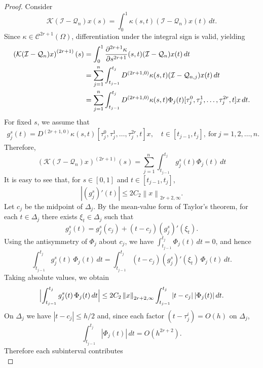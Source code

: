 \documentclass[]{interact}
\theoremstyle{plain}%
\theoremstyle{definition}
\theoremstyle{remark}
\newcommand{\norm}[1]{\left\lVert #1\right\rVert}
\begin{document}
\begin{proof}
	\noindent
	Consider 
	\begin{equation*} 
		\mathcal{K}(\mathcal{I} - \mathcal{Q}_n)x(s) =\int_0^1  \kappa(s,t) (\mathcal{I} - \mathcal{Q}_{n}) x(t) \, dt.
	\end{equation*}
	Since $\kappa \in \mathcal{C}^{2r+1}(\Omega)$, differentiation under the integral sign is valid, yielding
	\begin{align*} 
		\left(\mathcal{K}(\mathcal{I} - \mathcal{Q}_n)x\right)^{(2r+1)}(s) &=\int_0^1  \frac{\partial^{2r+1}\kappa}{\partial s^{2r+1}}(s,t) (\mathcal{I} - \mathcal{Q}_{n}) x(t) \, dt \notag \\ 
		&= \sum_{j=1}^{n} \int_{t_{j-1}}^{t_j}  D^{(2r+1,0)}\kappa(s,t) (\mathcal{I} - \mathcal{Q}_{n,j})x(t) \, dt \notag \\
		&=\sum_{j=1}^{n}\int_{t_{j-1}}^{t_j}
		D^{(2r+1,0)}\kappa(s,t)\Phi_j(t)
		[\tau_j^0,\tau_j^1,\ldots,\tau_j^{2r},t]x\,dt.  
	\end{align*}
	For fixed \(s\), we assume that
	\begin{align*}
		g_j^s(t) = D^{(2r+1,0)}\kappa(s,t) \left[\tau_j^0,\tau_j^1,\ldots, \tau_j^{2r},t\right]x, \quad t \in [t_{j-1}, t_j], ~ \text{for} ~ j=1,2,\ldots,n.
	\end{align*}
	Therefore,
	\begin{equation*} 
		\left(\mathcal{K}(\mathcal{I} - \mathcal{Q}_n)x\right)^{(2r+1)}(s)= \sum_{j=1}^{n ~}\int_{t_{j-1}}^{t_j} g_j^s(t) \Phi_j(t) \, dt
	\end{equation*}	
	It is easy to see that, for $s \in [0,1]$ and $t \in [t_{j-1},t_j]$,
	\begin{equation*}
		\left|(g_j^s)'(t) \right| \le 2 C_2 \norm{x}_{2r +2, \infty}.
	\end{equation*}
	Let $c_j$ be the midpoint of $\Delta_j$. By the mean-value form of Taylor's theorem, for each $t\in\Delta_j$ there exists $\xi_t\in\Delta_j$ such that
	\[
	g_j^s(t) = g_j^s(c_j) + (t-c_j)(g_j^s)'(\xi_t).
	\]
	Using the antisymmetry of $\Phi_j$ about $c_j$, we have $\int_{t_{j-1}}^{t_j}\Phi_j(t)\,dt=0$, and hence
	\[
	\int_{t_{j-1}}^{t_j} g_j^s(t)\,\Phi_j(t)\,dt
	= \int_{t_{j-1}}^{t_j} (t-c_j)(g_j^s)'(\xi_t)\,\Phi_j(t)\,dt.
	\]
	Taking absolute values, we obtain
	\[
	\Bigl|\int_{t_{j-1}}^{t_j} g_j^s(t)\,\Phi_j(t)\,dt\Bigr|
	\le 2C_2\norm{x}_{2r+2,\infty}\int_{t_{j-1}}^{t_j}|t-c_j|\,|\Phi_j(t)|\,dt.
	\]
	On $\Delta_j$ we have $|t-c_j|\le h/2$ and, since each factor $(t-\tau_j^i)=O(h)$ on $\Delta_j$,
	\[
	\int_{t_{j-1}}^{t_j}|\Phi_j(t)|\,dt = O(h^{2r+2}).
	\]
	Therefore each subinterval contributes
	\[
\]
\end{proof}
\end{document}
